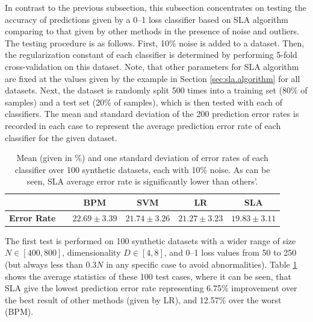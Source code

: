 In contrast to the previous subsection, this subsection concentrates on testing the accuracy of predictions given by a 0--1 loss classifier based on SLA algorithm comparing to that given by other methods in the presence of noise and outliers. The testing procedure is as follows. First, 10\% noise is added to a dataset. Then, the regularization constant of each classifier is determined by performing 5-fold cross-validation on this dataset. Note, that other parameters for SLA algorithm are fixed at the values given by the example in Section \ref{sec:sla.algorithm} for all datasets. Next, the dataset is randomly split 500 times into a training set (80\% of samples) and a test set (20\% of samples), which is then tested with each of classifiers. The mean and standard deviation of the 200 prediction error rates is recorded in each case to represent the average prediction error rate of each classifier for the given dataset. 

\begin{table}[htbp!]
\centering
\begin{tabular}{|cc|  ccc|c|}
\hline\hline
 && {\bf BPM} & {\bf SVM} & {\bf LR} & {\bf SLA}\\  
\hline
{\bf Error Rate} && $22.69 \pm 3.39$  & $21.74 \pm 3.26$ & $21.27 \pm 3.23$ & $19.83 \pm 3.11$\\
\hline\hline
\end{tabular}
\caption{Mean (given in \%) and one standard deviation of error rates of each classifier over 100 synthetic datasets, each with 10\% noise. As can be seen, SLA average error rate is significantly lower than others'.} 
\label{tab:errorrates}
\end{table}

The first test is performed on 100 synthetic datasets with a wider range of size $N \in [400, 800]$, dimensionality $D \in [4, 8]$, and 0--1 loss values from 50 to 250 (but always less than $0.3 N$ in any specific case to avoid abnormalities). Table \ref{tab:errorrates} shows the average statistics of these 100 test cases, where it can be seen, that SLA give the lowest prediction error rate representing 6.75\% improvement over the best result of other methods (given by LR), and 12.57\% over the worst (BPM). 

